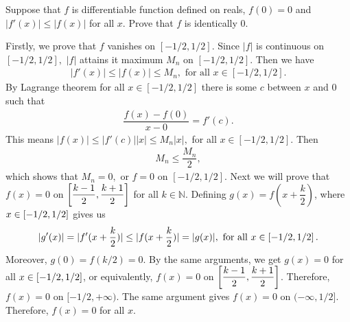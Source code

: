 \begin{problem}
Suppose that $f$ is differentiable function defined on reals, $f(0)=0$ and $|f'(x)|\le |f(x)|$ for all $x.$ Prove that $f$ is identically $0.$
\begin{solution}
Firstly, we prove that $f$ vanishes on $[-1/2,1/2].$ Since $|f|$ is continuous on $[-1/2,1/2],$ $|f|$ attains it maximum $M_n$ on $[-1/2,1/2].$ Then we have 
\begin{align*}
    |f'(x)|\le |f(x)|\le M_n,\text{ for all }x\in [-1/2,1/2].
\end{align*}
By Lagrange theorem for all $x\in [-1/2,1/2]$ there is some $c$ between $x$ and $0$ such that 
\begin{align*}
    \dfrac{f(x)-f(0)}{x-0}=f'(c).
\end{align*}
This means $|f(x)|\le |f'(c)||x|\le M_n |x|,$ for all $x\in [-1/2,1/2].$ Then 
\begin{align*}
    M_n \le \dfrac{M_n}{2},
\end{align*}
which shows that $M_n=0,$ or $f=0$ on $[-1/2,1/2].$
Next we will prove that $f(x)=0$ on $\left[ \dfrac{k-1}{2},\dfrac{k+1}{2}\right]$ for all $k\in \mathbb{N}.$ Defining $g(x)=f(x+\dfrac{k}{2})$, where $x\in \left[ -1/2,1/2\right] $  gives us 
\begin{align*}
    |g'(x)|=|f'(x+\dfrac{k}{2})|\le |f(x+\dfrac{k}{2})|=|g(x)|,\text{ for all }x\in \left[ -1/2,1/2\right].
\end{align*}
Moreover, $g(0)=f(k/2)=0.$ By the same arguments, we get $g(x)=0$ for all $x\in \left[ -1/2,1/2\right]$, or equivalently, $f(x)=0$ on $\left[ \dfrac{k-1}{2},\dfrac{k+1}{2}\right]$. Therefore, $f(x)=0$ on $[-1/2,+\infty).$ The same argument gives $f(x)=0$ on $(-\infty,1/2].$ Therefore, $f(x)=0$ for all $x.$
\end{solution}
\end{problem}

